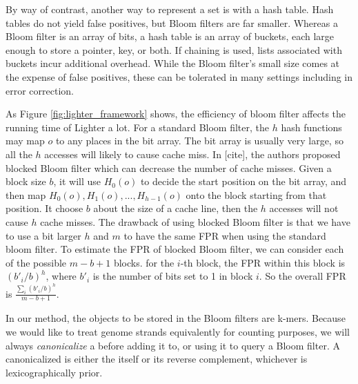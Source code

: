 \documentclass[10pt]{article}
\begin{document}
By way of contrast, another way to represent a set is with a hash table.  Hash tables do not yield false positives, but Bloom filters are far smaller.  Whereas a Bloom filter is an array of bits, a hash table is an array of buckets, each large enough to store a pointer, key, or both.  If chaining is used, lists associated with buckets incur additional overhead.  While the Bloom filter's small size comes at the expense of false positives, these can be tolerated in many settings including in error correction.

As Figure \ref{fig:lighter_framework} shows, the efficiency of bloom filter affects the running time of Lighter a lot. For a standard Bloom filter, the $h$ hash functions may map $o$ to any places in the bit array. The bit array is usually very large, so all the $h$ accesses will likely to cause cache miss. In [cite], the authors proposed blocked Bloom filter which can decrease the number of cache misses. Given a block size $b$, it will use $H_0(o)$ to decide the start position on the bit array, and then map $H_0(o), H_1(o),...,H_{h-1}(o)$ onto the block starting from that position. It choose $b$ about the size of a cache line, then the $h$ accesses will not cause $h$ cache misses. The drawback of using blocked Bloom filter is that we have to use a bit larger $h$ and $m$ to have the same FPR when using the standard bloom filter. To estimate the FPR of blocked Bloom filter, we can consider each of the possible $m-b+1$ blocks. for the $i$-th block, the FPR within this block is $(b'_i/b)^h$, where $b'_i$ is the number of bits set to 1 in block $i$. So the overall FPR is $\displaystyle\frac{\sum_i (b'_i/b)^h}{m-b+1}$.

In our method, the objects to be stored in the Bloom filters are k-mers.  Because we would like to treat genome strands equivalently for counting purposes, we will always \emph{canonicalize} a \kmer before adding it to, or using it to query a Bloom filter.  A canonicalized \kmer is either the \kmer itself or its reverse complement, whichever is lexicographically prior.

\end{document}
